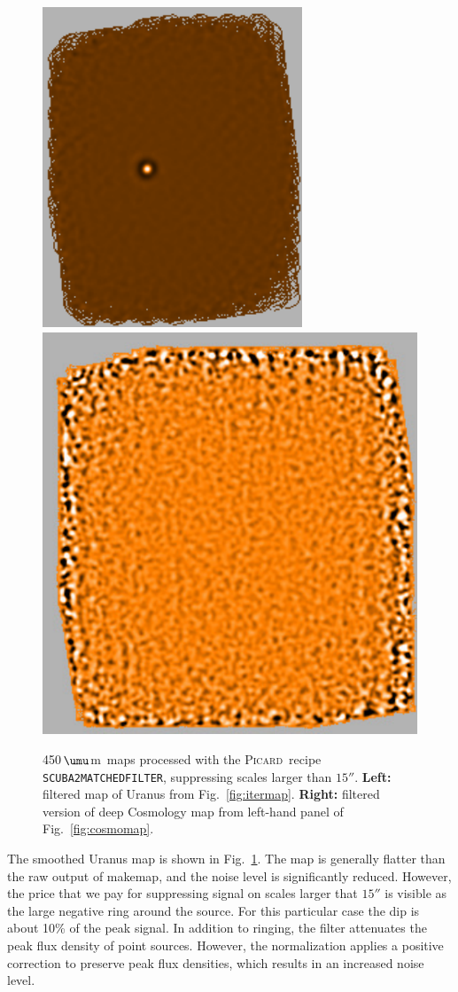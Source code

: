 \documentclass[twoside,11pt]{article}
\newcommand{\micron}{\mbox{\,${\umu}$m}}            %
\newcommand{\xref}[3]{#1}
\renewcommand{\_}{\texttt{\symbol{95}}}
\newcommand{\picard}{\xref{\textsc{Picard}}{sun231}{}}
\newcommand{\task}[1]{\textsf{#1}}
\newcommand{\makemap}{\xref{\task{makemap}}{sun258}{MAKEMAP}}
\begin{document}
\begin{figure}
\begin{center}
\includegraphics[width=0.46\linewidth]{sc19_uranus_filt}
\includegraphics[width=0.525\linewidth]{sc19_cosmo_map_filt}
\caption{450\micron\ maps processed with the \picard\ recipe
  \texttt{SCUBA2\_MATCHED\_FILTER}, suppressing scales larger than
  $15''$. {\bf Left:} filtered map of Uranus from
  Fig.~\ref{fig:itermap}. {\bf Right:} filtered version of deep
  Cosmology map from left-hand panel of Fig.~\ref{fig:cosmomap}.}
\label{fig:cosmo_filt}
\end{center}
\end{figure}

The smoothed Uranus map is shown in Fig.~\ref{fig:cosmo_filt}. The map
is generally flatter than the raw output of \makemap, and the noise
level is significantly reduced. However, the price that we pay for
suppressing signal on scales larger that $15''$ is visible as the
large negative ring around the source. For this particular case the
dip is about 10\% of the peak signal. In addition to ringing, the
filter attenuates the peak flux density of point sources. However, the
normalization applies a positive correction to preserve peak flux
densities, which results in an increased noise level.
\end{document}

